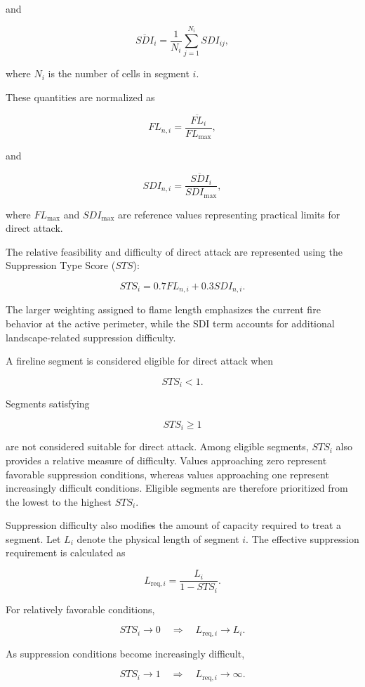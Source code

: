 and

\[
\overline{SDI}_i
=
\frac{1}{N_i}
\sum_{j=1}^{N_i}SDI_{ij},
\]

where $N_i$ is the number of cells in segment $i$.

These quantities are normalized as

\[
FL_{n,i}
=
\frac{\overline{FL}_i}
     {FL_{\max}},
\]

and

\[
SDI_{n,i}
=
\frac{\overline{SDI}_i}
     {SDI_{\max}},
\]

where $FL_{\max}$ and $SDI_{\max}$ are reference values representing practical
limits for direct attack.

The relative feasibility and difficulty of direct attack are represented using
the Suppression Type Score ($STS$):

\[
STS_i
=
0.7FL_{n,i}
+
0.3SDI_{n,i}.
\]

The larger weighting assigned to flame length emphasizes the current fire
behavior at the active perimeter, while the SDI term accounts for additional
landscape-related suppression difficulty.

A fireline segment is considered eligible for direct attack when

\[
STS_i < 1.
\]

Segments satisfying

\[
STS_i \geq 1
\]

are not considered suitable for direct attack. Among eligible segments,
$STS_i$ also provides a relative measure of difficulty. Values approaching zero
represent favorable suppression conditions, whereas values approaching one
represent increasingly difficult conditions. Eligible segments are therefore
prioritized from the lowest to the highest $STS_i$.

Suppression difficulty also modifies the amount of capacity required to treat a
segment. Let $L_i$ denote the physical length of segment $i$. The effective
suppression requirement is calculated as

\[
L_{\mathrm{req},i}
=
\frac{L_i}
     {1-STS_i}.
\]

For relatively favorable conditions,

\[
STS_i \rightarrow 0
\quad\Longrightarrow\quad
L_{\mathrm{req},i}\rightarrow L_i.
\]

As suppression conditions become increasingly difficult,

\[
STS_i \rightarrow 1
\quad\Longrightarrow\quad
L_{\mathrm{req},i}\rightarrow\infty.
\]

